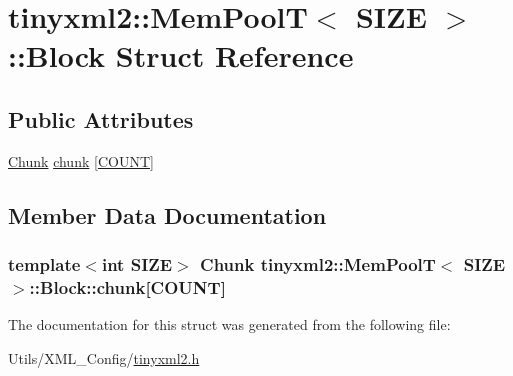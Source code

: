 \hypertarget{structtinyxml2_1_1_mem_pool_t_1_1_block}{\section{tinyxml2\-:\-:Mem\-Pool\-T$<$ S\-I\-Z\-E $>$\-:\-:Block Struct Reference}
\label{structtinyxml2_1_1_mem_pool_t_1_1_block}
}
\subsection*{Public Attributes}
\begin{DoxyCompactItemize}
\item 
\hyperlink{uniontinyxml2_1_1_mem_pool_t_1_1_chunk}{Chunk} \hyperlink{structtinyxml2_1_1_mem_pool_t_1_1_block_ae9cbe79b82d9490f15cc00d9694989e8}{chunk} \mbox{[}\hyperlink{classtinyxml2_1_1_mem_pool_t_a04cf45156e6f913f93972869ff8a1d94a4eeedbaa09fc9968120af6190e9e0988}{C\-O\-U\-N\-T}\mbox{]}
\end{DoxyCompactItemize}


\subsection{Member Data Documentation}
\hypertarget{structtinyxml2_1_1_mem_pool_t_1_1_block_ae9cbe79b82d9490f15cc00d9694989e8}{
\subsubsection[{chunk}]{\setlength{\rightskip}{0pt plus 5cm}template$<$int S\-I\-Z\-E$>$ {\bf Chunk} {\bf tinyxml2\-::\-Mem\-Pool\-T}$<$ S\-I\-Z\-E $>$\-::Block\-::chunk\mbox{[}{\bf C\-O\-U\-N\-T}\mbox{]}}}\label{structtinyxml2_1_1_mem_pool_t_1_1_block_ae9cbe79b82d9490f15cc00d9694989e8}


The documentation for this struct was generated from the following file\-:\begin{DoxyCompactItemize}
\item 
Utils/\-X\-M\-L\-\_\-\-Config/\hyperlink{tinyxml2_8h}{tinyxml2.\-h}\end{DoxyCompactItemize}
